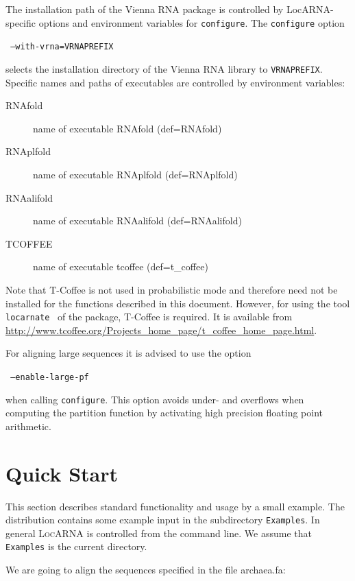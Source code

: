 \documentclass{article}
\newcommand{\LocARNA}{\textsc{LocARNA}}
\newenvironment{ttbox}{%
  \begin{framed}\begin{minipage}{1.0\textwidth}\tt}%
{\end{minipage}\end{framed}}
\begin{document}
The installation path of the Vienna RNA package is controlled by
LocARNA-specific options and environment variables for
\texttt{configure}.%
The \texttt{configure} option 
\begin{ttbox}
  --with-vrna=VRNAPREFIX
\end{ttbox}
\noindent
selects the installation directory of the Vienna RNA library to
\texttt{VRNAPREFIX}.
%
Specific names and paths of executables are controlled by environment
variables:
\begin{description}
\item[RNAfold] name of executable RNAfold (def=RNAfold)
\item[RNAplfold] name of executable RNAplfold (def=RNAplfold)
\item[RNAalifold] name of executable RNAalifold (def=RNAalifold)
\item[TCOFFEE] name of executable tcoffee (def=t\_coffee)
\end{description}

Note that T-Coffee is not used in probabilistic mode and therefore
need not be installed for the functions described in this
document. However, for using the tool
\texttt{locarnate}~\cite{Otto:Will:Backofen:_struc_local_multip_align_of_rna:CGB08}
of the package, T-Coffee is required. It is available from
\url{http://www.tcoffee.org/Projects_home_page/t_coffee_home_page.html}.

For aligning large sequences it is advised to use the option
\begin{ttbox}
  --enable-large-pf
\end{ttbox}
\noindent
when calling \texttt{configure}. This option avoids under- and
overflows when computing the partition function by activating high
precision floating point arithmetic.

\section{Quick Start}

This section describes standard functionality and usage by a small
example. The distribution contains some example input in the
subdirectory \texttt{Examples}. In general \LocARNA{} is controlled
from the command line. We assume that \texttt{Examples} is the current
directory.

We are going to align the sequences specified in the file archaea.fa:
\begin{framed}
   
\end{framed}
\end{document}
